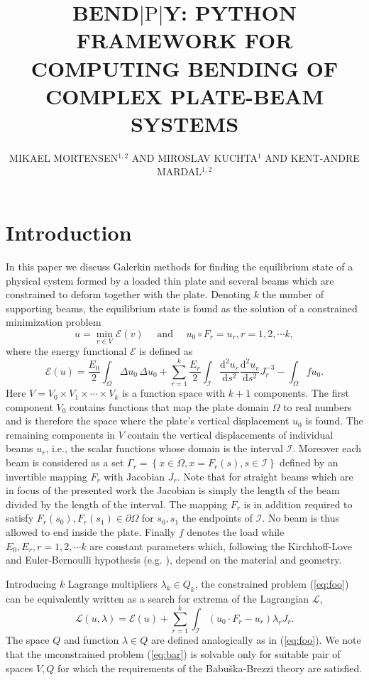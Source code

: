\documentclass{marine_2015}
\title{
  BEND$\left|\text{P}\right|$Y: PYTHON FRAMEWORK FOR COMPUTING BENDING OF COMPLEX PLATE-BEAM SYSTEMS
}
\author{MIKAEL MORTENSEN$^{1, 2}$ AND MIROSLAV KUCHTA$^{1}$ AND KENT-ANDRE MARDAL$^{1, 2}$ }
\newcommand{\deriv}[2]{\ensuremath{\frac{\mathrm{d}#1}{\mathrm{d}#2}}}
\begin{document}
\section{Introduction}
In this paper we discuss Galerkin methods for finding the equilibrium state of a 
physical system formed by a loaded thin plate and several beams which are constrained 
to deform together with the plate. Denoting $k$ the number of supporting beams, 
the equilibrium state is found as the solution of a constrained minimization problem
\begin{equation}
  \label{eq:foo}
  u = \min_{v\in V} \mathcal{E}\left(v\right)\quad\text{ and }\quad u_0\circ F_r
  = u_r, r=1, 2, \cdots k,
\end{equation}
where the energy functional $\mathcal{E}$ is defined as
\[
  \mathcal{E}\left(u\right)=
    \frac{E_0}{2}\displaystyle\int_{\Omega}\Delta u_0\,\Delta u_0+
    \sum_{r=1}^k\frac{E_r}{2}\int_{\mathcal{I}}
  \deriv{^2u_r}{s^2}\deriv{^2u_r}{s^2}J_r^{-3}
  -\displaystyle\int_{\Omega}f u_0.
\]
Here $V=V_0\times V_1 \times\cdots\times V_k$ is a function space with $k+1$
components. The first component $V_0$ contains functions that map the plate
domain $\Omega$ to real numbers and is therefore the space where the plate's
vertical displacement $u_0$ is found. The remaining components in $V$ contain the 
vertical displacements of individual beams $u_r$, i.e., the scalar 
functions whose domain is the interval $\mathcal{I}$. Moreover each beam is
considered as a set $\Gamma_r=\left\{x\in\Omega, x=F_r\left(s\right), s\in\mathcal{I}\right\}$
defined by an invertible mapping $F_r$ with Jacobian $J_r$. Note that for straight 
beams which are in focus of the presented work the Jacobian is simply the length of
the beam divided by the length of the interval. The mapping $F_r$ is in addition 
required to satisfy $F_r\left(s_0\right), F_r\left(s_1\right)\in\partial\Omega$ 
for $s_0, s_1$ the endpoints of $\mathcal{I}$. No beam is thus allowed to end inside 
the plate. Finally $f$ denotes the load while $E_0, E_r, r=1,2,\cdots k$ are 
constant parameters which, following the Kirchhoff-Love and Euler-Bernoulli
hypothesis (e.g. \cite{reddy}), depend on the material and geometry.

Introducing $k$ Lagrange multipliers $\lambda_k\in Q_k$, the constrained problem 
(\ref{eq:foo}) can be equivalently written as a search for extrema of the Lagrangian
$\mathcal{L}$,
\begin{equation}
  \label{eq:bar}
\mathcal{L}\left(u, \lambda\right) = \mathcal{E}\left(u\right) +
  \sum_{r=1}^k\int_{\mathcal{I}}\left(u_0\cdot F_r - u_r\right)\lambda_r J_r.
\end{equation}
The space $Q$ and function $\lambda\in Q$ are defined analogically as in (\ref{eq:foo}).
We note that the unconstrained problem (\ref{eq:bar}) is solvable only for
suitable pair of spaces $V, Q$ for which the requirements of the
Babu\v{s}ka-Brezzi\cite{babuska, brezzi} theory are satisfied.
\end{document}
